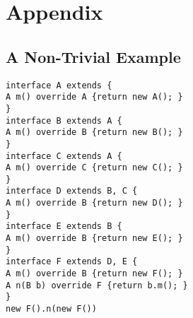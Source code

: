 \section{Appendix}

\subsection{A Non-Trivial Example}

\begin{lstlisting}
interface A extends {
A m() override A {return new A(); }
}
interface B extends A {
A m() override B {return new B(); }
}
interface C extends A {
A m() override C {return new C(); }
}
interface D extends B, C {
A m() override B {return new D(); }
}
interface E extends B {
A m() override B {return new E(); }
}
interface F extends D, E {
A m() override B {return new F(); } 
A n(B b) override F {return b.m(); }
}
new F().n(new F())
\end{lstlisting}

\begin{comment}
\[
\begin{array}{l}
\kwinterface \; A \; \kwextends \; \{ \\
\; \; \; \; A \; m() \; \kwoverride \; A \; \{\kwreturn \; \new A;\} \\
\} \\
\\
\kwinterface \; B \; \kwextends \; A \; \{ \\
\; \; \; \; A \; m() \; \kwoverride \; B \; \{\kwreturn \; \new B;\} \\
\} \\
\\
\kwinterface \; C \; \kwextends \; A \; \{ \\
\; \; \; \; A \; m() \; \kwoverride \; C \; \{\kwreturn \; \new C;\} \\
\} \\
\\
\kwinterface \; D \; \kwextends \; B, \; C \; \{ \\
\; \; \; \; A \; m() \; \kwoverride \; B \; \{\kwreturn \; \new D;\} \\
\} \\
\\
\kwinterface \; E \; \kwextends \; B \; \{ \\
\; \; \; \; A \; m() \; \kwoverride \; B \; \{\kwreturn \; \new E;\} \\
\} \\
\\
\kwinterface \; F \; \kwextends \; D, \; E \; \{ \\
\; \; \; \; A \; m() \; \kwoverride \; B \; \{\kwreturn \; \new F;\} \\
\; \; \; \; A \; n(B \; b) \; \kwoverride \; F \; \{\kwreturn \; b.m();\} \\
\} \\
\\
\new F.n(\new F)
\end{array}
\]
\end{comment}

